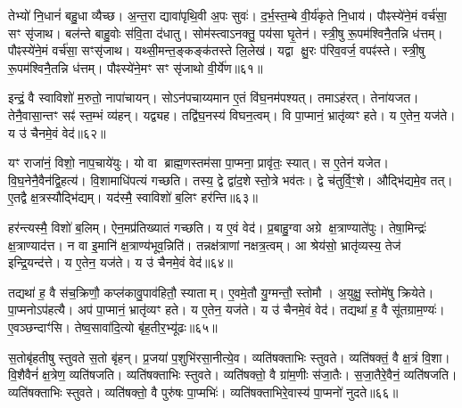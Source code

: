 तेभ्यो॑ नि॒धानं॑ बहु॒धा व्यैच्छ\sn{}।
अ॒न्त॒रा द्यावा॑पृथि॒वी अ॒पः सुवः॑।
द॒र्भ॒स्त॒म्बे वी॒र्य॑कृते नि॒धाय॑।
पौꣴस्ये॑ने॒मं वर्च॑सा॒ सꣳ सृ॑जाथ।
बल॑न्ते बाहु॒वोः स॑वि॒ता द॑धातु।
सोम॑स्त्वा\-ऽनक्तु॒ पय॑सा घृ॒तेन॑।
स्त्री॒षु रू॒पम॑श्विनै॒तन्नि ध॑त्तम्।
पौꣴस्ये॑ने॒मं वर्च॑सा॒ सꣳसृ॑जाथ।
यथ्सी॒मन्त॒ङ्कङ्क॑तस्ते लि॒लेख॑।
यद्वा क्षु॒रः प॑रिव॒वर्ज॒ वपꣴ॑स्ते।
स्त्री॒षु रू॒पम॑श्विनै॒तन्नि ध॑त्तम्।
पौꣴस्ये॑ने॒मꣳ सꣳ सृ॑जाथो वी॒र्ये॑ण॥६१॥\anuvakamend[अवास्राग्दी॒क्षा व॒शिनी॒ ह्यु॑ग्रा\-ऽद॑धाद्व॒वर्ज॒ वपꣴ॑ स्ते॒ द्वे च॑]

इन्द्रं॒ वै स्वाविशो॑ म॒रुतो॒ नापा॑चायन्।
सोऽन॑पचाय्यमान ए॒तं वि॑घ॒नम॑पश्यत्।
तमाऽह॑रत्।
तेना॑यजत।
तेनै॒वासा॒न्तꣳ सꣴ॑ स्त॒म्भं व्य॑हन्।
यद्व्यह\sn{}।
तद्वि॑घ॒नस्य॑ विघन॒त्वम्।
वि पा॒प्मानं॒ भ्रातृ॑व्यꣳ हते।
य ए॒तेन॒ यज॑ते।
य उ॑ चैनमे॒वं वेद॑॥६२॥

यꣳ राजा॑नं॒ विशो॒ नाप॒चाये॑युः।
यो वा ब्राह्म॒णस्तम॑सा पा॒प्मना॒ प्रावृ॑तः॒ स्यात्।
स ए॒तेन॑ यजेत।
वि॒घ॒नेनै॒वैन॑द्वि॒हत्य॑।
वि॒शामाधि॑पत्यं गच्छति।
तस्य॒ द्वे द्वा॑द॒शे स्तो॒त्रे भव॑तः।
द्वे च॑तुर्वि॒ꣳ॒शे।
औद्भि॑द्यमे॒व तत्।
ए॒तद्वै क्ष॒त्रस्यौद्भि॑द्यम्।
यद॑स्मै॒ स्वाविशो॑ ब॒लिꣳ हर॑न्ति॥६३॥

हर॑न्त्यस्मै॒ विशो॑ ब॒लिम्।
ऐन॒मप्र॑तिख्यातं गच्छति।
य ए॒वं वेद॑।
प्र॒बाहु॒ग्वा अग्रे क्ष॒त्राण्याते॑पुः।
तेषा॒मिन्द्रः॑ क्ष॒त्राण्याद॑त्त।
न वा इ॒मानि॑ क्ष॒त्राण्य॑भूव॒न्निति॑।
तन्नक्ष॑त्राणां नक्षत्र॒त्वम्।
आ श्रेय॑सो॒ भ्रातृ॑व्यस्य॒ तेज॑ इन्द्रि॒यन्द॑त्ते।
य ए॒तेन॒ यज॑ते।
य उ॑ चैनमे॒वं वेद॑॥६४॥

तद्यथा॑ ह॒ वै स॑च॒क्रिणौ॒ कप्ल॑कावु॒पाव॑हितौ॒ स्याताम्।
ए॒वमे॒तौ यु॒ग्मन्तौ॒ स्तोमौ।
अ॒युक्षु॒ स्तोमे॑षु क्रियेते।
पा॒प्मनो\-ऽप॑हत्यै।
अप॑ पा॒प्मानं॒ भ्रातृ॑व्यꣳ हते।
य ए॒तेन॒ यज॑ते।
य उ॑ चैनमे॒वं वेद॑।
तद्यथा॑ ह॒ वै सू॑तग्राम॒ण्यः॑।
ए॒वञ्छन्दाꣳ॑सि।
तेष्व॒सावा॑दि॒त्यो बृ॑ह॒तीर॒भ्यू॑ढः॥६५॥

स॒तोबृ॑हतीषु स्तुवते स॒तो बृ॑हन्।
प्र॒जया॑ प॒शुभि॑रसा॒नीत्ये॒व।
व्यति॑षक्ताभिः स्तुवते।
व्यति॑षक्तं॒ वै क्ष॒त्रं वि॒शा।
वि॒शैवैनं॑ क्ष॒त्रेण॒ व्यति॑षजति।
व्यति॑षक्ताभिः स्तुवते।
व्यति॑षक्तो॒ वै ग्रा॑म॒णीः स॑जा॒तैः।
स॒जा॒तैरे॒वैनं॒ व्यति॑षजति।
व्यति॑षक्ताभिः स्तुवते।
व्यति॑षक्तो॒ वै पुरु॑षः पा॒प्मभिः॑।
व्यति॑षक्ताभिरे॒वास्य॑ पा॒प्मनो॑ नुदते॥६६॥\anuvakamend[वेद॒ हर॑न्त्येनमे॒वं वेदा॒भ्यू॑ढः पा॒प्मभि॒रेकं॑ च]




\clearpage
{}
\setcounter{anuvakam}{0}

